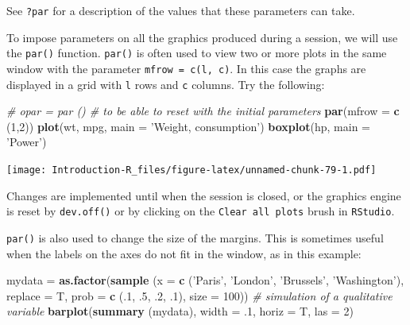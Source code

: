 \documentclass[]{book}
\newenvironment{Shaded}{\begin{snugshade}}{\end{snugshade}}
\newcommand{\CommentTok}[1]{\textcolor[rgb]{0.56,0.35,0.01}{\textit{#1}}}
\newcommand{\DataTypeTok}[1]{\textcolor[rgb]{0.13,0.29,0.53}{#1}}
\newcommand{\DecValTok}[1]{\textcolor[rgb]{0.00,0.00,0.81}{#1}}
\newcommand{\FloatTok}[1]{\textcolor[rgb]{0.00,0.00,0.81}{#1}}
\newcommand{\KeywordTok}[1]{\textcolor[rgb]{0.13,0.29,0.53}{\textbf{#1}}}
\newcommand{\NormalTok}[1]{#1}
\newcommand{\StringTok}[1]{\textcolor[rgb]{0.31,0.60,0.02}{#1}}
\begin{document}
See \texttt{?par} for a description of the values that these parameters can take.

To impose parameters on all the graphics produced during a session, we will use the \texttt{par()} function. \texttt{par()} is often used to view two or more plots in the same window with the parameter \texttt{mfrow\ =\ c(l,\ c)}. In this case the graphs are displayed in a grid with \texttt{l} rows and \texttt{c} columns. Try the following:

\begin{Shaded}
\begin{Highlighting}[]
\CommentTok{# opar = par () # to be able to reset with the initial parameters}
\KeywordTok{par}\NormalTok{(}\DataTypeTok{mfrow =} \KeywordTok{c}\NormalTok{ (}\DecValTok{1}\NormalTok{,}\DecValTok{2}\NormalTok{))}
\KeywordTok{plot}\NormalTok{(wt, mpg, }\DataTypeTok{main =} \StringTok{'Weight, consumption'}\NormalTok{)}
\KeywordTok{boxplot}\NormalTok{(hp, }\DataTypeTok{main =} \StringTok{'Power'}\NormalTok{)}
\end{Highlighting}
\end{Shaded}

\texttt{[image: Introduction-R\_files/figure-latex/unnamed-chunk-79-1.pdf]}

Changes are implemented until when the session is closed, or the graphics engine is reset by \texttt{dev.off()} or by clicking on the \texttt{Clear\ all\ plots} brush in \texttt{RStudio}.

\texttt{par()} is also used to change the size of the margins. This is sometimes useful when the labels on the axes do not fit in the window, as in this example:

\begin{Shaded}
\begin{Highlighting}[]
\NormalTok{mydata =}\StringTok{ }\KeywordTok{as.factor}\NormalTok{(}\KeywordTok{sample}\NormalTok{ (}\DataTypeTok{x =} \KeywordTok{c}\NormalTok{ (}\StringTok{'Paris'}\NormalTok{, }\StringTok{'London'}\NormalTok{, }\StringTok{'Brussels'}\NormalTok{, }\StringTok{'Washington'}\NormalTok{),}
                           \DataTypeTok{replace =}\NormalTok{ T,}
                           \DataTypeTok{prob =} \KeywordTok{c}\NormalTok{ (.}\DecValTok{1}\NormalTok{, }\FloatTok{.5}\NormalTok{, }\FloatTok{.2}\NormalTok{, }\FloatTok{.1}\NormalTok{),}
                           \DataTypeTok{size =} \DecValTok{100}\NormalTok{)) }\CommentTok{# simulation of a qualitative variable}
\KeywordTok{barplot}\NormalTok{(}\KeywordTok{summary}\NormalTok{ (mydata),}
        \DataTypeTok{width =} \FloatTok{.1}\NormalTok{,}
        \DataTypeTok{horiz =}\NormalTok{ T,}
        \DataTypeTok{las =} \DecValTok{2}\NormalTok{)}
\end{Highlighting}
\end{Shaded}
\end{document}
